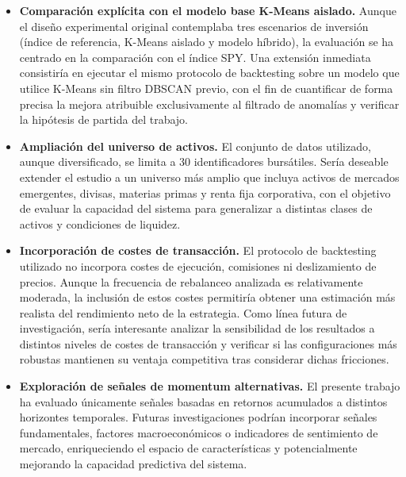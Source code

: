 \begin{itemize}

    \item \textbf{Comparación explícita con el modelo base K-Means 
    aislado.} Aunque el diseño experimental original contemplaba tres 
    escenarios de inversión (índice de referencia, K-Means aislado y 
    modelo híbrido), la evaluación se ha centrado en la comparación con 
    el índice SPY. Una extensión inmediata consistiría en ejecutar el 
    mismo protocolo de backtesting sobre un modelo que utilice K-Means 
    sin filtro DBSCAN previo, con el fin de cuantificar de forma 
    precisa la mejora atribuible exclusivamente al filtrado de 
    anomalías y verificar la hipótesis de partida del trabajo.

    \item \textbf{Ampliación del universo de activos.} El conjunto de 
    datos utilizado, aunque diversificado, se limita a 30 
    identificadores bursátiles. Sería deseable extender el estudio a un 
    universo más amplio que incluya activos de mercados emergentes, 
    divisas, materias primas y renta fija corporativa, con el objetivo 
    de evaluar la capacidad del sistema para generalizar a distintas 
    clases de activos y condiciones de liquidez.

    \item \textbf{Incorporación de costes de transacción.} El protocolo de
    backtesting utilizado no incorpora costes de ejecución, comisiones ni
    deslizamiento de precios. Aunque la frecuencia de rebalanceo analizada
    es relativamente moderada, la inclusión de estos costes permitiría
    obtener una estimación más realista del rendimiento neto de la
    estrategia. Como línea futura de investigación, sería interesante
    analizar la sensibilidad de los resultados a distintos niveles de costes
    de transacción y verificar si las configuraciones más robustas mantienen
    su ventaja competitiva tras considerar dichas fricciones.

    \item \textbf{Exploración de señales de momentum alternativas.} El 
    presente trabajo ha evaluado únicamente señales basadas en retornos 
    acumulados a distintos horizontes temporales. Futuras 
    investigaciones podrían incorporar señales fundamentales, factores 
    macroeconómicos o indicadores de sentimiento de mercado, 
    enriqueciendo el espacio de características y potencialmente 
    mejorando la capacidad predictiva del sistema.


\end{itemize}
